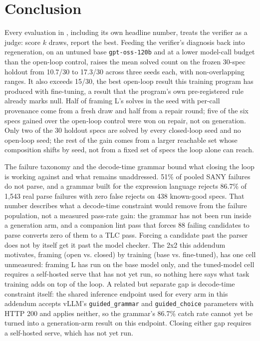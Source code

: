 \section{Conclusion}\label{sec:conclusion}

Every evaluation in \ours{}, including its own headline number, treats the
verifier as a judge: score $k$ draws, report the best. Feeding the verifier's
diagnosis back into regeneration, on an untuned base \texttt{gpt-oss-120b} and
at a lower model-call budget than the open-loop control, raises the mean
solved count on the frozen 30-spec holdout from 10.7/30 to 17.3/30 across
three seeds each, with non-overlapping ranges. It also exceeds 15/30, the best
open-loop result this training program has produced with fine-tuning, a
result that the program's own pre-registered rule already marks null. Half of
framing L's solves in the seed with per-call provenance come from a fresh
draw and half from a repair round; five of the six specs gained over the
open-loop control were won on repair, not on generation. Only two of the 30
holdout specs are solved by every closed-loop seed and no open-loop seed; the
rest of the gain comes from a larger reachable set whose composition shifts
by seed, not from a fixed set of specs the loop alone can reach.

The failure taxonomy and the decode-time grammar bound what closing the loop
is working against and what remains unaddressed. 51\% of pooled SANY failures
do not parse, and a grammar built for the \tlaplus{} expression language
rejects 86.7\% of 1,543 real parse failures with zero false rejects on 438
known-good specs. That number describes what a decode-time constraint would
remove from the failure population, not a measured pass-rate gain: the
grammar has not been run inside a generation arm, and a companion lint pass
that forces 88 failing candidates to parse converts zero of them to a TLC
pass. Forcing a candidate past the parser does not by itself get it past the
model checker. The 2x2 this addendum motivates, framing (open vs. closed) by
training (base vs. fine-tuned), has one cell unmeasured: framing L has run on
the base model only, and the tuned-model cell requires a self-hosted serve
that has not yet run, so nothing here says what task training adds on top of
the loop. A related but separate gap is decode-time constraint itself: the
shared inference endpoint used for every arm in this addendum accepts vLLM's
\texttt{guided\_grammar} and \texttt{guided\_choice} parameters with HTTP 200
and applies neither, so the grammar's 86.7\% catch rate cannot yet be turned
into a generation-arm result on this endpoint. Closing either gap requires a
self-hosted serve, which has not yet run.
